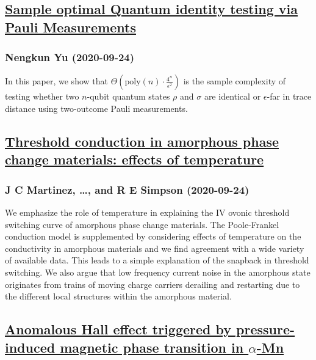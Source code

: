 \subsection*{\href{http://arxiv.org/abs/2009.11518v1}{Sample optimal Quantum identity testing via Pauli Measurements}}
\subsubsection*{Nengkun Yu (2020-09-24)}
In this paper, we show that
$\Theta(\mathrm{poly}(n)\cdot\frac{4^n}{\epsilon^2})$ is the sample complexity
of testing whether two $n$-qubit quantum states $\rho$ and $\sigma$ are
identical or $\epsilon$-far in trace distance using two-outcome Pauli
measurements.

\subsection*{\href{http://arxiv.org/abs/2009.11517v1}{Threshold conduction in amorphous phase change materials: effects of  temperature}}
\subsubsection*{J C Martinez, \dots, and R E Simpson (2020-09-24)}
We emphasize the role of temperature in explaining the IV ovonic threshold
switching curve of amorphous phase change materials. The Poole-Frankel
conduction model is supplemented by considering effects of temperature on the
conductivity in amorphous materials and we find agreement with a wide variety
of available data. This leads to a simple explanation of the snapback in
threshold switching. We also argue that low frequency current noise in the
amorphous state originates from trains of moving charge carriers derailing and
restarting due to the different local structures within the amorphous material.

\subsection*{\href{http://arxiv.org/abs/2009.11512v1}{Anomalous Hall effect triggered by pressure-induced magnetic phase  transition in $α$-Mn}}
